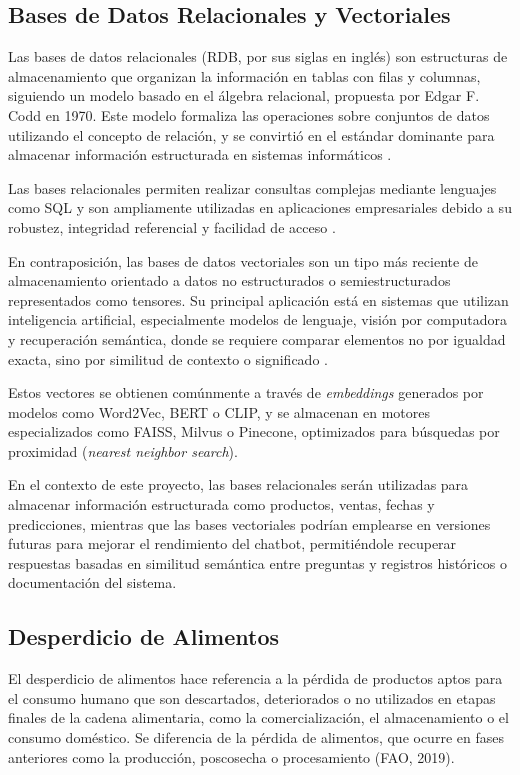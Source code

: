 \subsection{Bases de Datos Relacionales y Vectoriales}

Las bases de datos relacionales (RDB, por sus siglas en inglés) son estructuras de almacenamiento que organizan la información en tablas con filas y columnas, siguiendo un modelo basado en el álgebra relacional, propuesta por Edgar F. Codd en 1970. Este modelo formaliza las operaciones sobre conjuntos de datos utilizando el concepto de relación, y se convirtió en el estándar dominante para almacenar información estructurada en sistemas informáticos \parencite{codd1970}. 

Las bases relacionales permiten realizar consultas complejas mediante lenguajes como SQL y son ampliamente utilizadas en aplicaciones empresariales debido a su robustez, integridad referencial y facilidad de acceso \parencite{coronel2020}.

En contraposición, las bases de datos vectoriales son un tipo más reciente de almacenamiento orientado a datos no estructurados o semiestructurados representados como tensores. Su principal aplicación está en sistemas que utilizan inteligencia artificial, especialmente modelos de lenguaje, visión por computadora y recuperación semántica, donde se requiere comparar elementos no por igualdad exacta, sino por similitud de contexto o significado \parencite{johnson2019}.

Estos vectores se obtienen comúnmente a través de \textit{embeddings} generados por modelos como Word2Vec, BERT o CLIP, y se almacenan en motores especializados como FAISS, Milvus o Pinecone, optimizados para búsquedas por proximidad (\textit{nearest neighbor search}).

En el contexto de este proyecto, las bases relacionales serán utilizadas para almacenar información estructurada como productos, ventas, fechas y predicciones, mientras que las bases vectoriales podrían emplearse en versiones futuras para mejorar el rendimiento del chatbot, permitiéndole recuperar respuestas basadas en similitud semántica entre preguntas y registros históricos o documentación del sistema.

\subsection{Desperdicio de Alimentos}

El desperdicio de alimentos hace referencia a la pérdida de productos aptos para el consumo humano que son descartados, deteriorados o no utilizados en etapas finales de la cadena alimentaria, como la comercialización, el almacenamiento o el consumo doméstico. Se diferencia de la pérdida de alimentos, que ocurre en fases anteriores como la producción, poscosecha o procesamiento (FAO, 2019).

